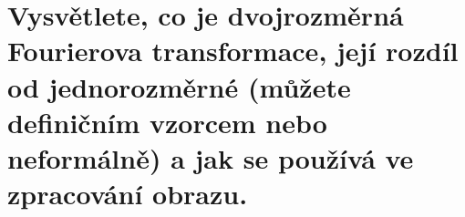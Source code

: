\section{Vysvětlete, co je dvojrozměrná Fourierova transformace, její rozdíl od jednorozměrné (můžete definičním vzorcem 
nebo neformálně) a jak se používá ve zpracování obrazu.}
